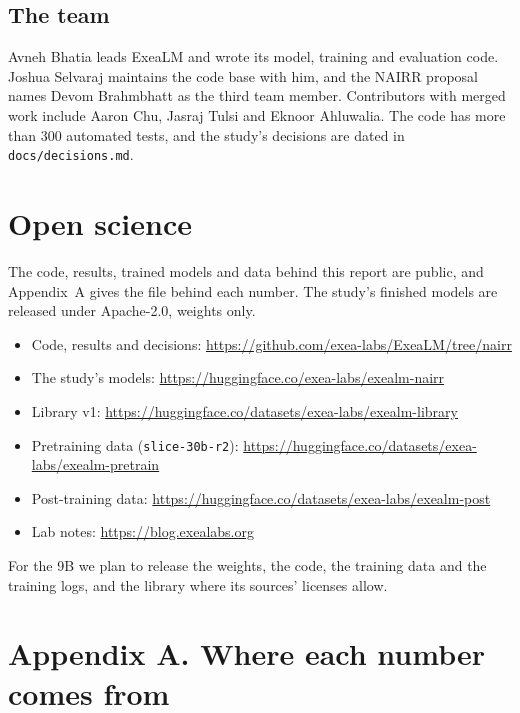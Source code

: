 \documentclass[11pt,letterpaper]{article}
\begin{document}
\subsection{The team}

Avneh Bhatia leads ExeaLM and wrote its model, training and evaluation code.
Joshua Selvaraj maintains the code base with him, and the NAIRR proposal names Devom Brahmbhatt as the third team member.
Contributors with merged work include Aaron Chu, Jasraj Tulsi and Eknoor Ahluwalia.
The code has more than 300 automated tests, and the study's decisions are dated in \texttt{docs/decisions.md}.

\section{Open science}

The code, results, trained models and data behind this report are public, and Appendix~A gives the file behind each number.
The study's finished models are released under Apache-2.0, weights only.

\begin{itemize}
\item Code, results and decisions: \url{https://github.com/exea-labs/ExeaLM/tree/nairr}
\item The study's models: \url{https://huggingface.co/exea-labs/exealm-nairr}
\item Library v1: \url{https://huggingface.co/datasets/exea-labs/exealm-library}
\item Pretraining data (\texttt{slice-30b-r2}): \url{https://huggingface.co/datasets/exea-labs/exealm-pretrain}
\item Post-training data: \url{https://huggingface.co/datasets/exea-labs/exealm-post}
\item Lab notes: \url{https://blog.exealabs.org}
\end{itemize}

For the 9B we plan to release the weights, the code, the training data and the training logs, and the library where its sources' licenses allow.

\newpage
\appendix
\section*{Appendix A. Where each number comes from}
\end{document}
